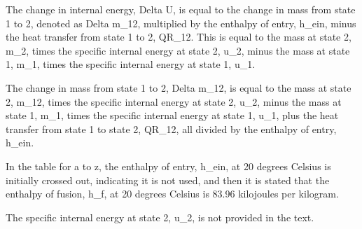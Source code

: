 The change in internal energy, Delta U, is equal to the change in mass from state 1 to 2, denoted as Delta m_12, multiplied by the enthalpy of entry, h_ein, minus the heat transfer from state 1 to 2, QR_12. This is equal to the mass at state 2, m_2, times the specific internal energy at state 2, u_2, minus the mass at state 1, m_1, times the specific internal energy at state 1, u_1.

The change in mass from state 1 to 2, Delta m_12, is equal to the mass at state 2, m_12, times the specific internal energy at state 2, u_2, minus the mass at state 1, m_1, times the specific internal energy at state 1, u_1, plus the heat transfer from state 1 to state 2, QR_12, all divided by the enthalpy of entry, h_ein.

In the table for a to z, the enthalpy of entry, h_ein, at 20 degrees Celsius is initially crossed out, indicating it is not used, and then it is stated that the enthalpy of fusion, h_f, at 20 degrees Celsius is 83.96 kilojoules per kilogram.

The specific internal energy at state 2, u_2, is not provided in the text.
